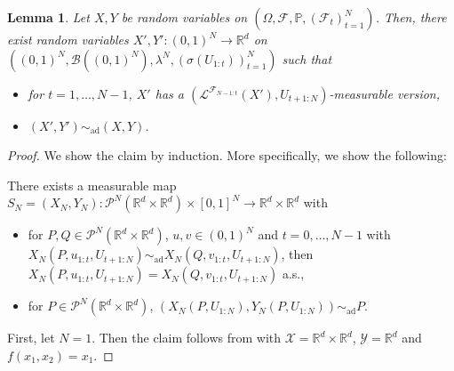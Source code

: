 \documentclass[a4paper]{amsart}
\numberwithin{theorem}{section}
\newtheorem{lemma}[theorem]{Lemma}
\theoremstyle{definition}
\newcommand{\R}{\mathbb{R}}
\newcommand{\F}{\mathcal{F}}
\newcommand{\B}{\mathcal{B}}
\newcommand{\law}{\mathcal{L}}
\newcommand{\Pc}{\mathcal P}
\renewcommand{\P}{\mathbb{P}}
\newcommand{\simad}{\sim_{\mathrm{ad}}}
\begin{document}
\begin{lemma}\label{lem:ip-meas-rv}
    Let $X,Y$ be random variables on $(\Omega,\mathcal F,\P, (\F_t)_{t = 1}^N)$.
    Then, there exist random variables $X',Y' : (0,1)^N \to \R^d$ on $((0,1)^N,\B((0,1)^N),\lambda^N, (\sigma(U_{1:t}))_{t = 1}^N)$ such that
    \begin{itemize}
        \item for $t = 1,\dots, N-1$, $X'$ has a $(\law^{\mathcal F_{N-1:t}}(X'),U_{t+1:N})$-measurable version,
        \item $(X',Y') \simad (X,Y)$.
    \end{itemize}
\end{lemma}

\begin{proof}
    We show the claim by induction.
    More specifically, we show the following:

    There exists a measurable map $S_N = (X_N,Y_N) : \Pc^N(\R^d \times \R^d) \times [0,1]^N \to \R^d \times \R^d$ with
    \begin{itemize}
        \item for $P,Q \in \Pc^N(\R^d \times \R^d)$, $u,v \in (0,1)^N$ and $t = 0,\dots,N-1$ with $X_N(P,u_{1:t},U_{t+1:N}) \simad X_N(Q,v_{1:t},U_{t+1:N})$, then $X_N(P,u_{1:t},U_{t+1:N}) = X_N(Q,v_{1:t},U_{t+1:N})$ a.s.,
        \item for $P \in \Pc^N(\R^d \times \R^d)$, $(X_N(P,U_{1:N}),Y_N(P,U_{1:N})) \simad P$.
    \end{itemize}

    First, let $N = 1$. Then the claim follows from  with $\mathcal X = \R^d \times \R^d$, $\mathcal Y = \R^d$ and $f(x_1,x_2) = x_1$.


\end{proof}
\end{document}
